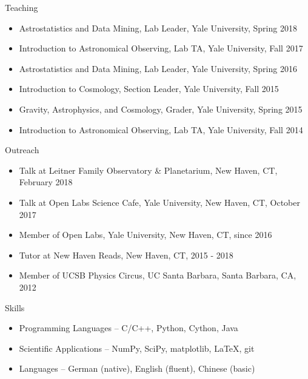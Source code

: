 \documentclass[11pt]{resume} %
\begin{document}
\begin{rSection}{Teaching}
  \begin{itemize}[leftmargin=1.0cm, topsep=0pt,itemsep=0pt,partopsep=0pt, parsep=0pt]
    \item Astrostatistics and Data Mining, Lab Leader, Yale University, Spring 2018
    \item Introduction to Astronomical Observing, Lab TA, Yale University, Fall 2017
    \item Astrostatistics and Data Mining, Lab Leader, Yale University, Spring 2016
    \item Introduction to Cosmology, Section Leader, Yale University, Fall 2015
    \item Gravity, Astrophysics, and Cosmology, Grader, Yale University, Spring 2015
    \item Introduction to Astronomical Observing, Lab TA, Yale University, Fall 2014
  \end{itemize}
\end{rSection}

\begin{rSection}{Outreach}
  \begin{itemize}[leftmargin=1.0cm, topsep=0pt,itemsep=0pt,partopsep=0pt, parsep=0pt]
    \item Talk at Leitner Family Observatory \& Planetarium, New Haven, CT, February 2018
    \item Talk at Open Labs Science Cafe, Yale University, New Haven, CT, October 2017
    \item Member of Open Labs, Yale University, New Haven, CT, since 2016
    \item Tutor at New Haven Reads, New Haven, CT, 2015 - 2018
    \item Member of UCSB Physics Circus, UC Santa Barbara, Santa Barbara, CA, 2012
  \end{itemize}
\end{rSection}

\begin{rSection}{Skills}
  \begin{itemize}[leftmargin=1.0cm, topsep=0pt,itemsep=0pt,partopsep=0pt, parsep=0pt]
    \item Programming Languages – C/C++, Python, Cython, Java
    \item Scientific Applications – NumPy, SciPy, matplotlib, LaTeX, git
    \item Languages – German (native), English (fluent), Chinese (basic)
  \end{itemize}
\end{rSection}
\end{document}
